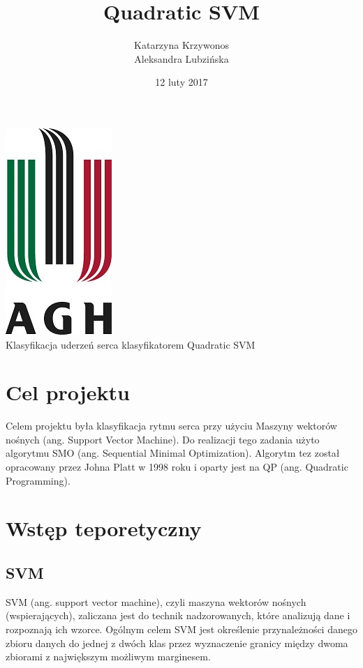 \documentclass[11pt]{article}
\begin{document}
\title{Quadratic SVM}
\author{Katarzyna Krzywonos \\ Aleksandra Lubzińska}
\date{12 luty 2017}
\maketitle


\begin{center}
\includegraphics{logo_agh}\\
\vspace{20mm}
{\LARGE Klasyfikacja uderzeń serca klasyfikatorem Quadratic SVM}\\

\end{center}

\newpage
\tableofcontents
\vspace{10mm}
\newpage
\section*{Cel projektu}
Celem projektu była klasyfikacja rytmu serca przy użyciu Maszyny wektorów nośnych (ang. Support Vector Machine). Do realizacji tego zadania użyto algorytmu SMO (ang. Sequential Minimal Optimization). Algorytm tez został opracowany przez Johna Platt w 1998 roku i oparty jest na QP (ang. Quadratic Programming).

\section{Wstęp teporetyczny}
\subsection{SVM}
SVM (ang. support vector machine), czyli maszyna wektorów nośnych
(wspierających), zaliczana jest do technik nadzorowanych, które analizują dane i rozpoznają
ich wzorce. Ogólnym celem SVM jest określenie przynależności danego zbioru danych do
jednej z dwóch klas przez wyznaczenie granicy między dwoma zbiorami z największym
możliwym marginesem.
\end{document}
